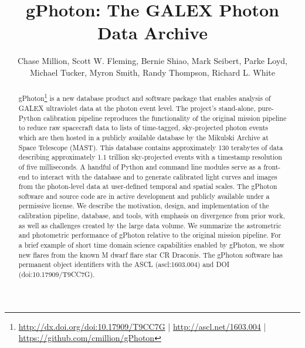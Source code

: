 \documentclass[preprint]{aastex}
\begin{document}
\title{gPhoton: The GALEX Photon Data Archive}

\author{
  Chase Million,
  Scott W. Fleming,
  Bernie Shiao,
  Mark Seibert,
  Parke Loyd,
  Michael Tucker,
  Myron Smith,
  Randy Thompson,
  Richard L. White
}



\begin{abstract}
gPhoton\footnote{\url{http://dx.doi.org/doi:10.17909/T9CC7G} | \url{http://ascl.net/1603.004} | \url{https://github.com/cmillion/gPhoton}} is a new database product and software package that enables analysis of GALEX ultraviolet data at the photon event level. The project's stand-alone, pure-Python calibration pipeline reproduces the functionality of the original mission pipeline to reduce raw spacecraft data to lists of time-tagged, sky-projected photon events which are then hosted in a publicly available database by the Mikulski Archive at Space Telescope (MAST). This database contains approximately 130 terabytes of data describing approximately 1.1 trillion sky-projected events with a timestamp resolution of five milliseconds. A handful of Python and command line modules serve as a front-end to interact with the database and to generate calibrated light curves and images from the photon-level data at user-defined temporal and spatial scales. The gPhoton software and source code are in active development and publicly available under a permissive license. We describe the motivation, design, and implementation of the calibration pipeline, database, and tools, with emphasis on divergence from prior work, as well as challenges created by the large data volume. We summarize the astrometric and photometric performance of gPhoton relative to the original mission pipeline. For a brief example of short time domain science capabilities enabled by gPhoton, we show new flares from the known M dwarf flare star CR Draconis. The gPhoton software has permanent object identifiers with the ASCL (ascl:1603.004) and DOI (doi:10.17909/T9CC7G).
\end{abstract}
\end{document}

